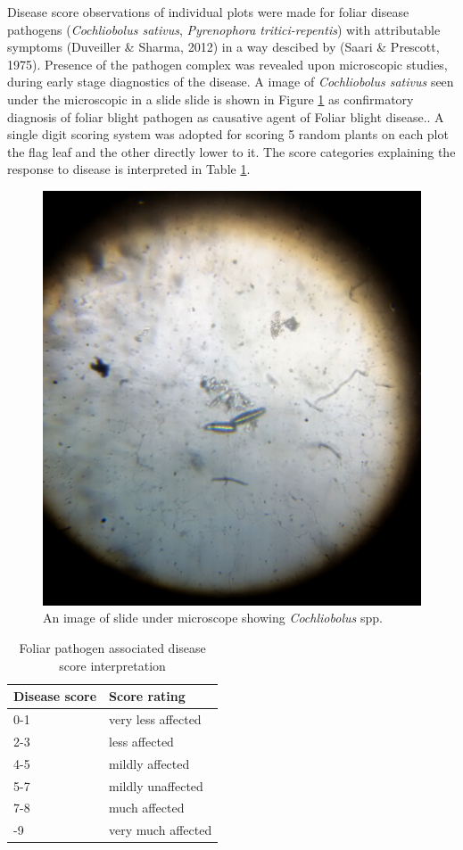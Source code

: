 \documentclass[12pt,oneside]{dukestatscithesis} %
\begin{document}
Disease score observations of individual plots were made for foliar disease pathogens (\emph{Cochliobolus sativus}, \emph{Pyrenophora tritici-repentis}) with attributable symptoms (Duveiller \& Sharma, 2012) in a way descibed by (Saari \& Prescott, 1975). Presence of the pathogen complex was revealed upon microscopic studies, during early stage diagnostics of the disease. A image of \emph{Cochliobolus sativus} seen under the microscopic in a slide slide is shown in Figure \ref{fig:microscope-disease} as confirmatory diagnosis of foliar blight pathogen as causative agent of Foliar blight disease.. A single digit scoring system was adopted for scoring 5 random plants on each plot the flag leaf and the other directly lower to it. The score categories explaining the response to disease is interpreted in Table \ref{tab:fpa-leaf-score}.
\begin{figure}

{\centering \includegraphics[width=0.8\linewidth]{../images/disease_diag/distinct_spores_20161225_114304} 

}

\caption{An image of slide under microscope showing \textit{Cochliobolus} spp.}\label{fig:microscope-disease}
\end{figure}
\begin{table}

\caption{\label{tab:fpa-leaf-score}Foliar pathogen associated disease score interpretation}
\centering
\begin{tabular}[t]{ll}
\toprule
\textbf{Disease score} & \textbf{Score rating}\\
\midrule
0-1 & very less affected\\
2-3 & less affected\\
4-5 & mildly affected\\
5-7 & mildly unaffected\\
7-8 & much affected\\
\addlinespace
8-9 & very much affected\\
\bottomrule
\end{tabular}
\end{table}
\end{document}
